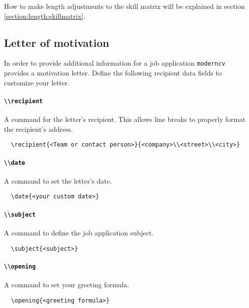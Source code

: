 \documentclass[a4paper, 11pt]{article}
\newcommand{\code}[1]{\lstinline!#1!}
\newcommand{\moderncv}{\code{moderncv}}
\begin{document}
How to make length adjustments to the skill matrix will be explained in section \ref{section:length:skillmatrix}.

\subsection{Letter of motivation}

In order to provide additional information for a job application {\moderncv} provides a motivation letter.\newline
Define the following recipient data fields to customize your letter.
\paragraph{\code{\\recipient}}
A command for the letter's recipient. This allows line breaks to properly format the recipient's address.
\begin{lstlisting}
  \recipient{<Team or contact person>}{<company>\\<street>\\<city>}
\end{lstlisting}

\paragraph{\code{\\date}}
A command to set the letter's date.
\begin{lstlisting}
  \date{<your custom date>}
\end{lstlisting}

\paragraph{\code{\\subject}}
A command to define the job application subject.
\begin{lstlisting}
  \subject{<subject>}
\end{lstlisting}

\paragraph{\code{\\opening}}
A command to set your greeting formula.
\begin{lstlisting}
  \opening{<greeting formula>}
\end{lstlisting}
\end{document}
